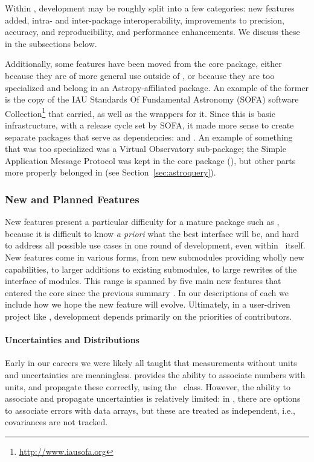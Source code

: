 \documentclass[modern]{aastex631}
\begin{document}
Within \astropypkg, development may be roughly split into a few
categories: new features added, intra- and inter-package interoperability,
improvements to precision, accuracy, and reproducibility, and performance
enhancements. We discuss these in the subsections below.

Additionally, some features have been moved from the core package, either
because they are of more general use outside of \astropypkg, or because they are
too specialized and belong in an Astropy-affiliated package. An example of the
former is the copy of the IAU Standards Of Fundamental Astronomy (SOFA) software
Collection\footnote{\url{http://www.iausofa.org}} \citep{sofa} that \astropy
carried, as well as the \python wrappers for it. Since this is basic
infrastructure, with a release cycle set by SOFA, it made more sense to create
separate packages that serve as \astropypkg dependencies: 
\citep{erfa} and  \citep{pyerfa}. An example of something that
was too specialized was a Virtual Observatory sub-package; the Simple
Application Message Protocol was kept in the core package
(), but other parts more properly belonged in
 (see Section~\ref{sec:astroquery}).


\subsubsection{New and Planned Features} \label{sec:core-features-new}

New features present a particular difficulty for a mature package such as
\astropypkg, because it is difficult to know {\em a priori} what the best
interface will be, and hard to address all possible use cases in one round of
development, even within \astropypkg\ itself. New features come in various forms,
from new submodules providing wholly new capabilities, to larger additions to
existing submodules, to large rewrites of the interface of modules. This range
is spanned by five main new features that entered the \astropypkg core since the
previous summary . In our descriptions of each we
include how we hope the new feature will evolve. Ultimately, in a user-driven
project like \astropy, development depends primarily on the priorities of
contributors.

\paragraph{Uncertainties and Distributions} Early in our careers we were likely
all taught that measurements without units and uncertainties are meaningless.
\astropyunits provides the ability to associate numbers with units, and
propagate these correctly, using the \astropyQuantity\ class. However, the
ability to associate and propagate uncertainties is relatively limited: in
, there are options to associate errors with data arrays,
but these are treated as independent, i.e., covariances are not tracked.
\end{document}
